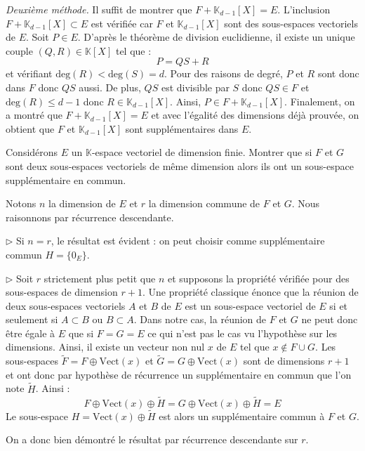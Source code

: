 \documentclass[a4paper,10pt]{report}
\begin{document}
\begin{enumerate}
\noindent \textit{Deuxième méthode.}  Il suffit de montrer que $F + \mathbb{K}_{d-1}[X]=E$. L'inclusion  $ F + \mathbb{K}_{d-1}[X] \subset E$ est vérifiée car $F$ et $\mathbb{K}_{d-1}[X]$ sont des sous-espaces vectoriels de $E$. Soit $P \in E$. D'après le théorème de division euclidienne, il existe un unique couple $(Q,R) \in \mathbb{K}[X]$ tel que :
$$ P = QS+R$$
et vérifiant $\textrm{deg}(R) < \textrm{deg}(S) = d$. Pour des raisons de degré, $P$ et $R$ sont donc dans $F$ donc $QS$ aussi. De plus, $QS$ est divisible par $S$ donc $QS \in F$ et $\textrm{deg}(R) \leq d-1$ donc $R \in \mathbb{K}_{d-1}[X]$. Ainsi, $P \in F + \mathbb{K}_{d-1}[X]$. Finalement, on a montré que $F + \mathbb{K}_{d-1}[X]=E$ et avec l'égalité des dimensions déjà prouvée, on obtient que $F$ et $\mathbb{K}_{d-1}[X]$ sont supplémentaires dans $E$.
\end{enumerate}

\medskip


\begin{Exa} Considérons $E$ un $\mathbb{K}$-espace vectoriel de dimension finie. Montrer que si $F$ et $G$ sont deux sous-espaces vectoriels de même dimension alors ils ont un sous-espace supplémentaire en commun.
\end{Exa}

\corr Notons $n$ la dimension de $E$ et $r$ la dimension commune de $F$ et $G$. Nous raisonnons par récurrence descendante.

\medskip

\noindent $\rhd$ Si $n=r$, le résultat est évident : on peut choisir comme supplémentaire commun $H = \lbrace 0_E \rbrace$.

\medskip

\noindent $\rhd$ Soit $r$ strictement plus petit que $n$ et supposons la propriété vérifiée pour des sous-espaces de dimension $r+1$. Une propriété classique énonce que la réunion de deux sous-espaces vectoriels $A$ et $B$ de $E$ est un sous-espace vectoriel de $E$ si et seulement si $A \subset B$ ou $B \subset A$. Dans notre cas, la réunion de $F$ et $G$ ne peut donc être égale à $E$ que si $F=G=E$ ce qui n'est pas le cas vu l'hypothèse sur les dimensions. Ainsi, il existe un vecteur non nul $x$ de $E$ tel que $x \notin F \cup G$. Les sous-espaces $\tilde{F}= F \oplus \textrm{Vect}(x)$ et $\tilde{G}= G \oplus \textrm{Vect}(x)$ sont de dimensions $r+1$ et ont donc par hypothèse de récurrence un supplémentaire en commun que l'on note $\tilde{H}$. Ainsi :
$$  F \oplus \textrm{Vect}(x) \oplus \tilde{H} =  G \oplus \textrm{Vect}(x) \oplus \tilde{H} = E$$
Le sous-espace $H=\textrm{Vect}(x) \oplus \tilde{H}$ est alors un supplémentaire commun à $F$ et $G$.

\medskip

\noindent On a donc bien démontré le résultat par récurrence descendante sur $r$.
\end{document}
